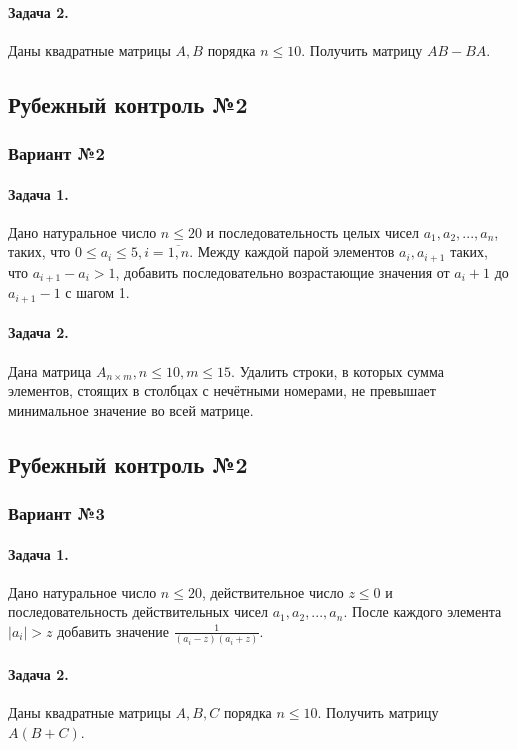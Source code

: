 \documentclass[12pt,a4paper]{report}
\begin{document}
\paragraph*{Задача 2.} Даны квадратные матрицы $A, B$ порядка $n \le 10$. Получить матрицу $AB-BA$.

\subsection*{Рубежный контроль №2}
\subsubsection*{Вариант №2}
\paragraph*{Задача 1.} Дано натуральное число $n \le 20$ и последовательность целых чисел $a_1, a_2, ..., a_n$, таких, что $0 \le a_i  \le 5, i = \overline{1,n}$. Между каждой парой элементов $a_i, a_{i+1}$ таких, что $a_{i+1} - a_i > 1$, добавить последовательно возрастающие значения от $a_i + 1$ до $a_{i+1} - 1$ с шагом 1.
\paragraph*{Задача 2.} Дана матрица $A_{n \times m}, n \le 10, m \le 15$. Удалить строки, в которых сумма элементов, стоящих в столбцах с нечётными номерами, не превышает минимальное значение во всей матрице.

\subsection*{Рубежный контроль №2}
\subsubsection*{Вариант №3}
\paragraph*{Задача 1.} Дано натуральное число $n \le 20$, действительное число $z \le 0$ и последовательность действительных чисел $a_1, a_2, ..., a_n$. После каждого элемента $|a_i| > z$ добавить значение $ \frac {1} {(a_i - z)(a_i + z)}$.
\paragraph*{Задача 2.} Даны квадратные матрицы $A, B, C$ порядка $n \le 10$. Получить матрицу $A(B+C)$.
\end{document}
